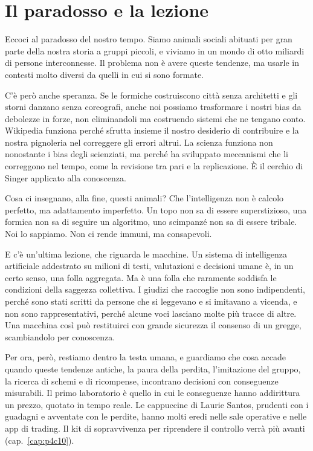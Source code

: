 \section{Il paradosso e la lezione}

Eccoci al paradosso del nostro tempo. Siamo animali sociali abituati per gran parte della nostra storia a gruppi piccoli, e viviamo in un mondo di otto miliardi di persone interconnesse. Il problema non è avere queste tendenze, ma usarle in contesti molto diversi da quelli in cui si sono formate.

C'è però anche speranza. Se le formiche costruiscono città senza architetti e gli storni danzano senza coreografi, anche noi possiamo trasformare i nostri bias da debolezze in forze, non eliminandoli ma costruendo sistemi che ne tengano conto. Wikipedia funziona perché sfrutta insieme il nostro desiderio di contribuire e la nostra pignoleria nel correggere gli errori altrui. La scienza funziona non nonostante i bias degli scienziati, ma perché ha sviluppato meccanismi che li correggono nel tempo, come la revisione tra pari e la replicazione. È il cerchio di Singer applicato alla conoscenza.

Cosa ci insegnano, alla fine, questi animali? Che l'intelligenza non è calcolo perfetto, ma adattamento imperfetto. Un topo non sa di essere superstizioso, una formica non sa di seguire un algoritmo, uno scimpanzé non sa di essere tribale. Noi lo sappiamo. Non ci rende immuni, ma consapevoli.

E c'è un'ultima lezione, che riguarda le macchine. Un sistema di intelligenza artificiale addestrato su milioni di testi, valutazioni e decisioni umane è, in un certo senso, una folla aggregata. Ma è una folla che raramente soddisfa le condizioni della saggezza collettiva. I giudizi che raccoglie non sono indipendenti, perché sono stati scritti da persone che si leggevano e si imitavano a vicenda, e non sono rappresentativi, perché alcune voci lasciano molte più tracce di altre. Una macchina così può restituirci con grande sicurezza il consenso di un gregge, scambiandolo per conoscenza.

Per ora, però, restiamo dentro la testa umana, e guardiamo che cosa accade quando queste tendenze antiche, la paura della perdita, l'imitazione del gruppo, la ricerca di schemi e di ricompense, incontrano decisioni con conseguenze misurabili. Il primo laboratorio è quello in cui le conseguenze hanno addirittura un prezzo, quotato in tempo reale. Le cappuccine di Laurie Santos, prudenti con i guadagni e avventate con le perdite, hanno molti eredi nelle sale operative e nelle app di trading. Il kit di sopravvivenza per riprendere il controllo verrà più avanti (cap.~\ref{cap:p4c10}).
